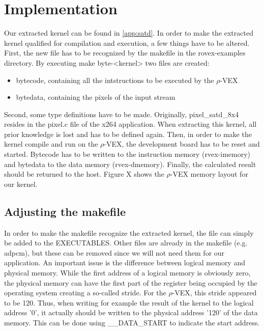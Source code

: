 
\section{Implementation}

Our extracted kernel can be found in \ref{app:satd}. In order to make the extracted kernel qualified for compilation and execution, a few things have to be altered. First, the new file has to be recognized by the makefile in the rovex-examples directory. By executing make byte-<kernel> two files are created:
\begin{itemize}
	\item bytecode, containing all the intstructions to be executed by the $\rho$-VEX
	\item bytedata, containing the pixels of the input stream
\end{itemize}

Second, some type definitions have to be made. Originally, pixel\_satd\_8x4 resides in the pixel.c file of the x264 application. When extracting this kernel, all prior knowledge is lost and has to be defined again. Then, in order to make the kernel compile and run on the $\rho$-VEX, the development board has to be reset and started. Bytecode has to be written to the instruction memory (rvex-imemory) and bytedata to the data memory (rvex-dmemory). Finally, the calculated result should be returned to the host. Figure X shows the $\rho$-VEX memory layout for our kernel.

\subsection{Adjusting the makefile}

In order to make the makefile recognize the extracted kernel, the file can simply be added to the EXECUTABLES. Other files are already in the makefile (e.g. adpcm), but these can be removed since we will not need them for our application. An important issue is the difference between logical memory and physical memory. While the first address of a logical memory is obviously zero, the physical memory can have the first part of the register being occupied by the operating system creating a so-called stride. For the $\rho$-VEX, this stride appeared to be 120. Thus, when writing for example the result of the kernel to the logical address '0', it actually should be written to the physical address '120' of the data memory. This can be done using \_\_DATA\_START to indicate the start address.

